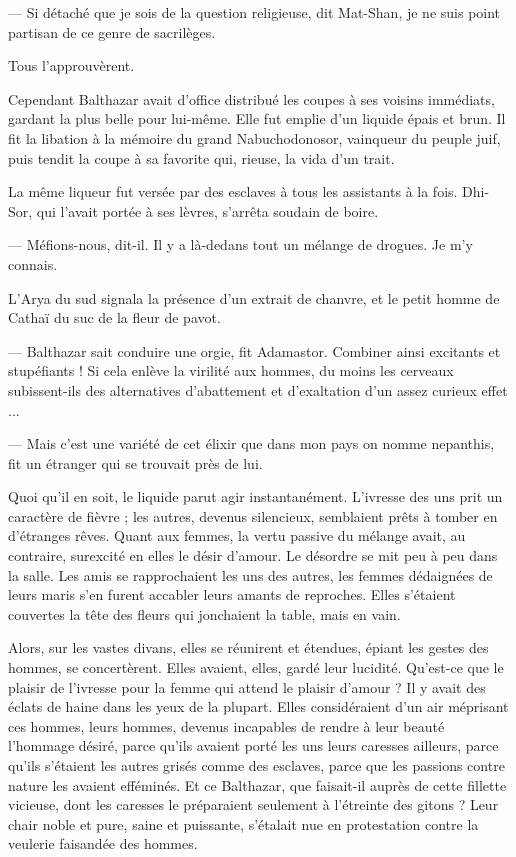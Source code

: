 \documentclass[a4paper, 11pt, oneside, polutonikogreek, french]{article}
\begin{document}
--- Si détaché que je sois de la question religieuse, dit Mat-Shan, je ne suis point partisan de ce genre de sacrilèges.

Tous l'approuvèrent.

Cependant Balthazar avait d'office distribué les coupes à ses voisins immédiats, gardant la plus belle pour lui-même. Elle fut emplie d'un liquide épais et brun. Il fit la libation à la mémoire du grand Nabuchodonosor, vainqueur du peuple juif, puis tendit la coupe à sa favorite qui, rieuse, la vida d'un trait.

La même liqueur fut versée par des esclaves à tous les assistants à la fois. Dhi-Sor, qui l'avait portée à ses lèvres, s'arrêta soudain de boire.

--- Méfions-nous, dit-il. Il y a là-dedans tout un mélange de drogues. Je m'y connais.

L'Arya du sud signala la présence d'un extrait de chanvre, et le petit homme de Cathaï du suc de la fleur de pavot.

--- Balthazar sait conduire une orgie, fit Adamastor. Combiner ainsi excitants et stupéfiants ! Si cela enlève la virilité aux hommes, du moins les cerveaux subissent-ils des alternatives d'abattement et d'exaltation d'un assez curieux effet ...

--- Mais c'est une variété de cet élixir que dans mon pays on nomme nepanthis, fit un étranger qui se trouvait près de lui.

\bigskip
\centerline{\EightStarTaper}
\centerline{\EightStarTaper\EightStarTaper}
\bigskip

Quoi qu'il en soit, le liquide parut agir instantanément. L'ivresse des uns prit un caractère de fièvre ; les autres, devenus silencieux, semblaient prêts à tomber en d'étranges rêves. Quant aux femmes, la vertu passive du mélange avait, au contraire, surexcité en elles le désir d'amour. Le désordre se mit peu à peu dans la salle. Les amis se rapprochaient les uns des autres, les femmes dédaignées de leurs maris s'en furent accabler leurs amants de reproches. Elles s'étaient couvertes la tête des fleurs qui jonchaient la table, mais en vain.

Alors, sur les vastes divans, elles se réunirent et étendues, épiant les gestes des hommes, se concertèrent. Elles avaient, elles, gardé leur lucidité. Qu'est-ce que le plaisir de l'ivresse pour la femme qui attend le plaisir d'amour ? Il y avait des éclats de haine dans les yeux de la plupart. Elles considéraient d'un air méprisant ces hommes, leurs hommes, devenus incapables de rendre à leur beauté l'hommage désiré, parce qu'ils avaient porté les uns leurs caresses ailleurs, parce qu'ils s'étaient les autres grisés comme des esclaves, parce que les passions contre nature les avaient efféminés. Et ce Balthazar, que faisait-il auprès de cette fillette vicieuse, dont les caresses le préparaient seulement à l'étreinte des gitons ? Leur chair noble et pure, saine et puissante, s'étalait nue en protestation contre la veulerie faisandée des hommes.
\end{document}
